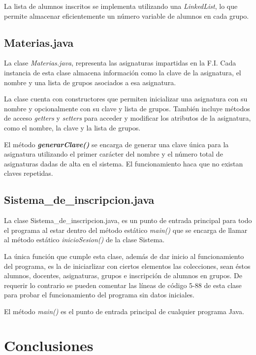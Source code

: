 \documentclass[a4paper,12pt]{article}
\begin{document}
La lista de alumnos inscritos se implementa utilizando una \textit{LinkedList}, lo que permite almacenar eficientemente un número variable de alumnos en cada grupo.

\subsection{Materias.java}

La clase \textit{Materias.java}, representa las asignaturas impartidas en la F.I. Cada instancia de esta clase almacena información como la clave de la asignatura, el nombre y una lista de grupos asociados a esa asignatura.

La clase cuenta con constructores que permiten inicializar una asignatura con su nombre y opcionalmente con su clave y lista de grupos. También incluye métodos de acceso \textit{getters} y \textit{setters} para acceder y modificar los atributos de la asignatura, como el nombre, la clave y la lista de grupos.

El método \textbf{\textit{generarClave()}} se encarga de generar una clave única para la asignatura utilizando el primer carácter del nombre y el número total de asignaturas dadas de alta en el sistema. El funcionamiento haca que no existan claves repetidas.

\subsection{Sistema\_de\_inscripcion.java}

La clase Sistema\_de\_inscripcion.java, es un punto de entrada principal para todo el programa al estar dentro del método estático \textit{main()} que se encarga de llamar al método estático \textit{inicioSesion()} de la clase Sistema.

La única función que cumple esta clase, además de dar inicio al funcionamiento del programa, es la de iniciarlizar con ciertos elementos las colecciones, sean éstos alumnos, docentes, asignaturas, grupos e inscripción de alumnos en grupos. De requerir lo contrario se pueden comentar las líneas de código 5-88 de esta clase para probar el funcionamiento del programa sin datos iniciales.

El método \textit{main()} es el punto de entrada principal de cualquier programa Java.

\section{Conclusiones}
\end{document}
